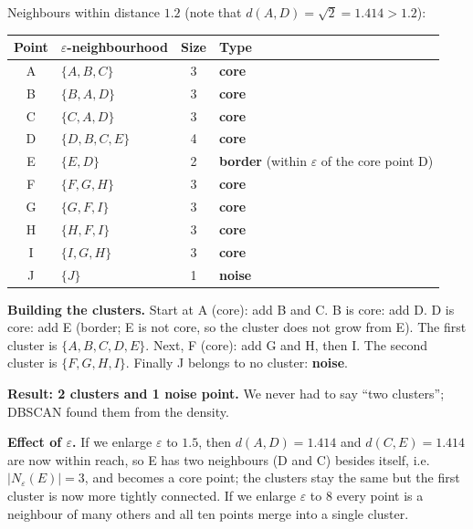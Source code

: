 \begin{example}
Neighbours within distance $1.2$ (note that $d(A,D)=\sqrt2=1.414>1.2$):

\begin{center}
\begin{tabular}{@{}c|l|c|l@{}}
\toprule
Point & $\varepsilon$-neighbourhood & Size & Type\\
\midrule
A & $\{A,B,C\}$ & 3 & \textbf{core}\\
B & $\{B,A,D\}$ & 3 & \textbf{core}\\
C & $\{C,A,D\}$ & 3 & \textbf{core}\\
D & $\{D,B,C,E\}$ & 4 & \textbf{core}\\
E & $\{E,D\}$ & 2 & \textbf{border} (within $\varepsilon$ of the core point D)\\
F & $\{F,G,H\}$ & 3 & \textbf{core}\\
G & $\{G,F,I\}$ & 3 & \textbf{core}\\
H & $\{H,F,I\}$ & 3 & \textbf{core}\\
I & $\{I,G,H\}$ & 3 & \textbf{core}\\
J & $\{J\}$ & 1 & \textbf{noise}\\
\bottomrule
\end{tabular}
\end{center}

\textbf{Building the clusters.} Start at A (core): add B and C. B is core: add D. D is core: add E (border; E is not core, so the cluster does not grow from E). The first cluster is $\{A,B,C,D,E\}$. Next, F (core): add G and H, then I. The second cluster is $\{F,G,H,I\}$. Finally J belongs to no cluster: \textbf{noise}.

\medskip
\textbf{Result: 2 clusters and 1 noise point.} We never had to say ``two clusters''; DBSCAN found them from the density.

\medskip
\textbf{Effect of $\varepsilon$.} If we enlarge $\varepsilon$ to $1.5$, then $d(A,D)=1.414$ and $d(C,E)=1.414$ are now within reach, so E has two neighbours (D and C) besides itself, i.e.\ $|N_\varepsilon(E)|=3$, and becomes a core point; the clusters stay the same but the first cluster is now more tightly connected. If we enlarge $\varepsilon$ to $8$ every point is a neighbour of many others and all ten points merge into a single cluster.
\end{example}

